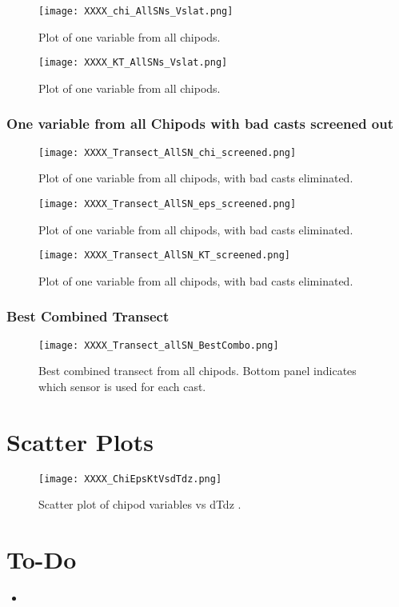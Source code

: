 \documentclass[11pt]{article}
\begin{document}
\begin{figure}[htbp]
\texttt{[image: XXXX\_chi\_AllSNs\_Vslat.png]}
\caption{Plot of one variable from all chipods.}
\label{}
\end{figure}

\begin{figure}[htbp]
\texttt{[image: XXXX\_KT\_AllSNs\_Vslat.png]}
\caption{Plot of one variable from all chipods.}
\label{}
\end{figure}



\clearpage
\newpage
\subsubsection{One variable from all Chipods with bad casts screened out}


\begin{figure}[htbp]
\texttt{[image: XXXX\_Transect\_AllSN\_chi\_screened.png]}
\caption{Plot of one variable from all chipods, with bad casts eliminated.}
\label{}
\end{figure}

\begin{figure}[htbp]
\texttt{[image: XXXX\_Transect\_AllSN\_eps\_screened.png]}
\caption{Plot of one variable from all chipods, with bad casts eliminated.}
\label{}
\end{figure}


\begin{figure}[htbp]
\texttt{[image: XXXX\_Transect\_AllSN\_KT\_screened.png]}
\caption{Plot of one variable from all chipods, with bad casts eliminated.}
\label{}
\end{figure}



\clearpage
\newpage
\subsubsection{Best Combined Transect}


\begin{figure}[htbp]
\texttt{[image: XXXX\_Transect\_allSN\_BestCombo.png]}
\caption{Best combined transect from all chipods. Bottom panel indicates which sensor is used for each cast.}
\label{}
\end{figure}




\clearpage
\newpage
\section{Scatter Plots}

\begin{figure}[htbp]
\texttt{[image: XXXX\_ChiEpsKtVsdTdz.png]}
\caption{Scatter plot of chipod variables vs dTdz .}
\label{}
\end{figure}



\newpage
\clearpage
\newpage
\section{To-Do}

\begin{itemize}
\item 
\end{itemize}
\end{document}

